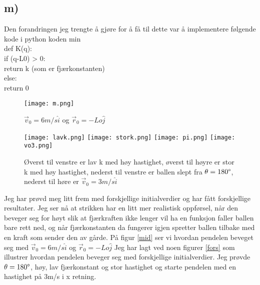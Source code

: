 \documentclass[a4paper,12pt,norsk]{article}
\begin{document}
\subsection*{m)}   
Den forandringen jeg trengte å gjøre for å få til dette var å implementere følgende kode i python koden min\\
def K(q):\\
if (q-L0) > 0:\\
return k (som er fjærkonstanten)\\
else:\\
return 0\\
\begin{figure}[h!]
\texttt{[image: m.png]} 
\caption{$\vec{v}_0 = 6 m/s\hat{i}$  og $\vec{r}_0 = -Lo\hat{j}$}
\label{mid}
\end{figure}
\begin{figure}[h!]
\texttt{[image: lavk.png]}
\texttt{[image: stork.png]} 
\texttt{[image: pi.png]} 
\texttt{[image: vo3.png]} 
\caption{Øverst til venstre er lav k med høy hastighet, øverst til høyre er stor k med høy hastighet, nederst til venstre er ballen slept fra $\theta = 180\degree$, nederst til høre er $\vec{v}_0 = 3m/s\hat{i}$}
\label{fors}
\end{figure}
Jeg har prøvd meg litt frem med forskjellige initialverdier og har fått forskjellige resultater. Jeg ser nå at strikken har en litt mer realistisk oppførsel, når den beveger seg for høyt slik at fjærkraften ikke lenger vil ha en funksjon faller ballen bare rett ned, og når fjærkonstanten da fungerer igjen spretter ballen tilbake med en kraft som sender den av gårde. På figur \vref{mid} ser vi hvordan pendelen beveget seg med $\vec{v}_0 = 6m/s\hat{i} $ og $\vec{r}_0 = -Lo\hat{j}$ Jeg har lagt ved noen figurer \vref{fors} som illustrer hvordan pendelen beveger seg med forskjellige initialverdier. Jeg prøvde $\theta = 180\degree$, høy, lav fjærkonstant og stor hastighet og starte pendelen med en hastighet på 3m/s i x retning. 
\end{document}
